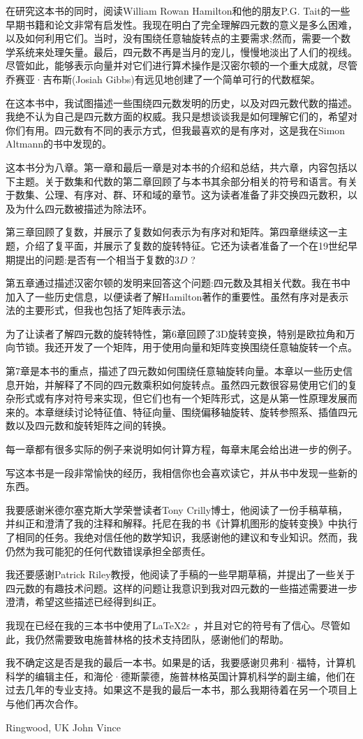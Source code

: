 在研究这本书的同时，阅读William Rowan Hamilton和他的朋友P.G. Tait的一些早期书籍和论文非常有启发性。我现在明白了完全理解四元数的意义是多么困难，以及如何利用它们。当时，没有围绕任意轴旋转点的主要需求;然而，需要一个数学系统来处理矢量。最后，四元数不再是当月的宠儿，慢慢地淡出了人们的视线。尽管如此，能够表示向量并对它们进行算术操作是汉密尔顿的一个重大成就，尽管乔赛亚·吉布斯(Josiah Gibbs)有远见地创建了一个简单可行的代数框架。

在这本书中，我试图描述一些围绕四元数发明的历史，以及对四元数代数的描述。我绝不认为自己是四元数方面的权威。我只是想谈谈我是如何理解它们的，希望对你们有用。四元数有不同的表示方式，但我最喜欢的是有序对，这是我在Simon Altmann的书中发现的。

这本书分为八章。第一章和最后一章是对本书的介绍和总结，共六章，内容包括以下主题。关于数集和代数的第二章回顾了与本书其余部分相关的符号和语言。有关于数集、公理、有序对、群、环和域的章节。这为读者准备了非交换四元数积，以及为什么四元数被描述为除法环。

第三章回顾了复数，并展示了复数如何表示为有序对和矩阵。第四章继续这一主题，介绍了复平面，并展示了复数的旋转特征。它还为读者准备了一个在19世纪早期提出的问题:是否有一个相当于复数的$3 D$ ?

第五章通过描述汉密尔顿的发明来回答这个问题:四元数及其相关代数。我在书中加入了一些历史信息，以便读者了解Hamilton著作的重要性。虽然有序对是表示法的主要形式，但我也包括了矩阵表示法。

为了让读者了解四元数的旋转特性，第6章回顾了3D旋转变换，特别是欧拉角和万向节锁。我还开发了一个矩阵，用于使用向量和矩阵变换围绕任意轴旋转一个点。

第7章是本书的重点，描述了四元数如何围绕任意轴旋转向量。本章以一些历史信息开始，并解释了不同的四元数乘积如何旋转点。虽然四元数很容易使用它们的复杂形式或有序对符号来实现，但它们也有一个矩阵形式，这是从第一性原理发展而来的。本章继续讨论特征值、特征向量、围绕偏移轴旋转、旋转参照系、插值四元数以及四元数和旋转矩阵之间的转换。

每一章都有很多实际的例子来说明如何计算方程，每章末尾会给出进一步的例子。

写这本书是一段非常愉快的经历，我相信你也会喜欢读它，并从书中发现一些新的东西。

我要感谢米德尔塞克斯大学荣誉读者Tony Crilly博士，他阅读了一份手稿草稿，并纠正和澄清了我的注释和解释。托尼在我的书《计算机图形的旋转变换》中执行了相同的任务。我绝对信任他的数学知识，我感谢他的建议和专业知识。然而，我仍然为我可能犯的任何代数错误承担全部责任。

我还要感谢Patrick Riley教授，他阅读了手稿的一些早期草稿，并提出了一些关于四元数的有趣技术问题。这样的问题让我意识到我对四元数的一些描述需要进一步澄清，希望这些描述已经得到纠正。

我现在已经在我的三本书中使用了\LaTeX$ 2\varepsilon$ ，并且对它的符号有了信心。尽管如此，我仍然需要致电施普林格的技术支持团队，感谢他们的帮助。

我不确定这是否是我的最后一本书。如果是的话，我要感谢贝弗利·福特，计算机科学的编辑主任，和海伦·德斯蒙德，施普林格英国计算机科学的副主编，他们在过去几年的专业支持。如果这不是我的最后一本书，那么我期待着在另一个项目上与他们再次合作。


Ringwood, UK  \hfill                                               John Vince
